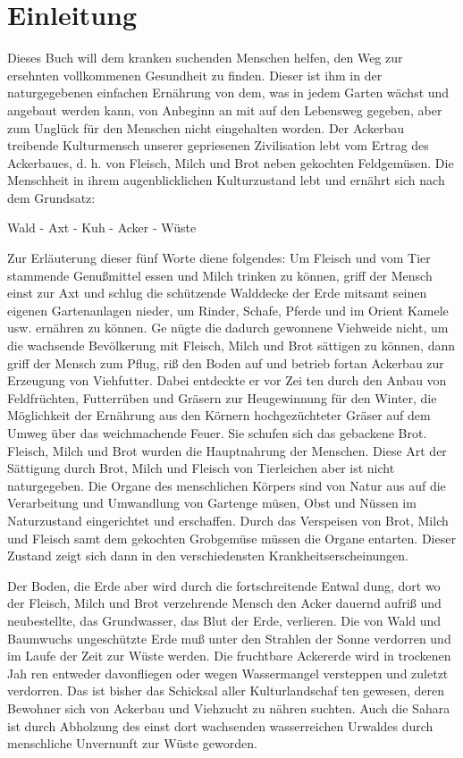 \section{Einleitung}

Dieses Buch will dem kranken suchenden Menschen helfen, den
Weg zur ersehnten vollkommenen Gesundheit zu finden. Dieser ist
ihm in der naturgegebenen einfachen Ernährung von dem, was in
jedem Garten wächst und angebaut werden kann, von Anbeginn an
mit auf den Lebensweg gegeben, aber zum Unglück für den Menschen
nicht eingehalten worden. Der Ackerbau treibende Kulturmensch
unserer gepriesenen Zivilisation lebt vom Ertrag des Ackerbaues,
d. h. von Fleisch, Milch und Brot neben gekochten Feldgemüsen. Die
Menschheit in ihrem augenblicklichen Kulturzustand lebt und ernährt
sich nach dem Grundsatz:

Wald - Axt - Kuh - Acker - Wüste

Zur Erläuterung dieser fünf Worte diene folgendes: Um Fleisch und
vom Tier stammende Genußmittel essen und Milch trinken zu können,
griff der Mensch einst zur Axt und schlug die schützende Walddecke
der Erde mitsamt seinen eigenen Gartenanlagen nieder, um Rinder,
Schafe, Pferde und im Orient Kamele usw. ernähren zu können. Ge­
nügte die dadurch gewonnene Viehweide nicht, um die wachsende
Bevölkerung mit Fleisch, Milch und Brot sättigen zu können, dann
griff der Mensch zum Pflug, riß den Boden auf und betrieb fortan
Ackerbau zur Erzeugung von Viehfutter. Dabei entdeckte er vor Zei­
ten durch den Anbau von Feldfrüchten, Futterrüben und Gräsern
zur Heugewinnung für den Winter, die Möglichkeit der Ernährung
aus den Körnern hochgezüchteter Gräser auf dem Umweg über das
weichmachende Feuer. Sie schufen sich das gebackene Brot. Fleisch,
Milch und Brot wurden die Hauptnahrung der Menschen. Diese Art
der Sättigung durch Brot, Milch und Fleisch von Tierleichen aber ist
nicht naturgegeben. Die Organe des menschlichen Körpers sind von
Natur aus auf die Verarbeitung und Umwandlung von Gartenge­
müsen, Obst und Nüssen im Naturzustand eingerichtet und erschaffen.
Durch das Verspeisen von Brot, Milch und Fleisch samt dem gekochten
Grobgemüse müssen die Organe entarten. Dieser Zustand zeigt sich
dann in den verschiedensten Krankheitserscheinungen.

Der Boden, die Erde aber wird durch die fortschreitende Entwal­
dung, dort wo der Fleisch, Milch und Brot verzehrende Mensch den
Acker dauernd aufriß und neubestellte, das Grundwasser, das Blut
der Erde, verlieren. Die von Wald und Baumwuchs ungeschützte Erde muß unter den Strahlen der Sonne verdorren und im Laufe der Zeit zur Wüste werden. Die fruchtbare Ackererde wird in trockenen Jah­
ren entweder davonfliegen oder wegen Wassermangel versteppen und
zuletzt verdorren. Das ist bisher das Schicksal aller Kulturlandschaf­
ten gewesen, deren Bewohner sich von Ackerbau und Viehzucht zu
nähren suchten. Auch die Sahara ist durch Abholzung des einst dort
wachsenden wasserreichen Urwaldes durch menschliche Unvernunft
zur Wüste geworden.

